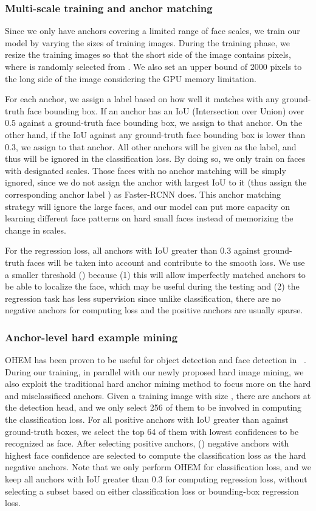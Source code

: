\documentclass[10pt,twocolumn,letterpaper]{article}
\begin{document}
\subsubsection*{Multi-scale training and anchor matching}\label{sec:multiscale}
Since we only have anchors covering a limited range of face scales, we train our model by varying the sizes of training images. During the training phase, we resize
the training images so that the short side of the image contains  pixels, where  is
randomly selected from . We also set an upper bound of 2000 pixels to the long side of the image considering the GPU memory limitation.

For each anchor, we assign a label  based on how well it matches with any ground-truth face bounding box. If an anchor has an IoU (Intersection over Union) over
0.5 against a ground-truth face bounding
box, we assign  to that anchor. On the other hand, if the IoU against any ground-truth
face bounding box is lower than 0.3, we assign  to that anchor. All other anchors will be given 
as the label, and thus will be ignored in the classification loss.
By doing so, we only train on faces with designated scales. Those faces with
no anchor matching will be simply ignored, since we do not assign the anchor with largest
IoU to it (thus assign the corresponding anchor label ) as Faster-RCNN does.
This anchor matching
strategy will ignore the large faces, and our model can put more
capacity on learning different face patterns on hard small faces
instead of memorizing the change in scales.


For the regression loss, all anchors with IoU greater than 0.3 against ground-truth faces will
be taken into account and contribute to the smooth  loss. We use
a smaller threshold () because (1) this will allow imperfectly matched
anchors to be able to localize the face, which may be useful during the
testing and (2) the regression task has less supervision since unlike
classification, there are no negative anchors for computing loss and the positive anchors are usually
sparse.
\subsubsection*{Anchor-level hard example mining}\label{section:OHEM}
OHEM has been proven to be useful for object detection and face detection in ~\cite{liu2016ssd,najibi2017ssh,shrivastava2016training}. During our
training, in parallel with our newly proposed hard image mining,
we also exploit the traditional hard anchor mining method to focus more on the
hard and misclassificed anchors. Given a training image with size ,
there are  anchors at the detection head,
and we only select 256 of them to be involved in computing the classification loss. For
all positive anchors with IoU greater than  against ground-truth boxes, we
select the top 64 of them with lowest confidences to be recognized as face. After selecting positive
anchors, () negative anchors with highest face confidence are selected
to compute the classification loss as the hard negative anchors. Note that we only perform OHEM for classification loss, and we keep all anchors with IoU greater than 0.3 for computing regression loss, without selecting a subset based on either classification loss or bounding-box regression loss.
\end{document}
